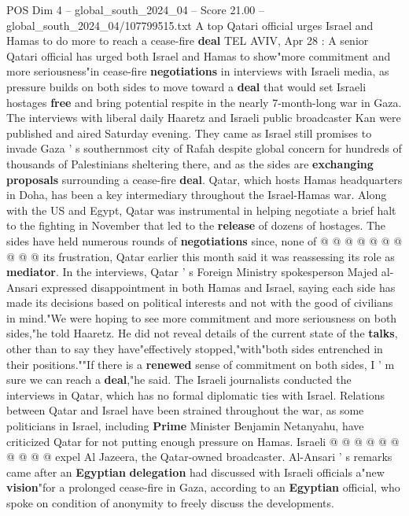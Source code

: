 \begin{textsample}{POS Dim 4 – global\_south\_2024\_04 – Score 21.00 – global\_south\_2024\_04/107799515.txt}  \label{ex:f4_pos_263}
A top Qatari official urges Israel and Hamas to do more to reach a cease-fire \textbf{deal} TEL AVIV, Apr 28 : A senior Qatari official has urged both Israel and Hamas to show"more commitment and more seriousness"in cease-fire \textbf{negotiations} in interviews with Israeli media, as pressure builds on both sides to move toward a \textbf{deal} that would set Israeli hostages \textbf{free} and bring potential respite in the nearly 7-month-long war in Gaza.
The interviews with liberal daily Haaretz and Israeli public broadcaster Kan were published and aired Saturday evening.
They came as Israel still promises to invade Gaza ' s southernmost city of Rafah despite global concern for hundreds of thousands of Palestinians sheltering there, and as the sides are \textbf{exchanging} \textbf{proposals} surrounding a cease-fire \textbf{deal}.
Qatar, which hosts Hamas headquarters in Doha, has been a key intermediary throughout the Israel-Hamas war.
Along with the US and Egypt, Qatar was instrumental in helping negotiate a brief halt to the fighting in November that led to the \textbf{release} of dozens of hostages.
The sides have held numerous rounds of \textbf{negotiations} since, none of @ @ @ @ @ @ @ @ @ @ its frustration, Qatar earlier this month said it was reassessing its role as \textbf{mediator}.
In the interviews, Qatar ' s Foreign Ministry spokesperson Majed al-Ansari expressed disappointment in both Hamas and Israel, saying each side has made its decisions based on political interests and not with the good of civilians in mind."We were hoping to see more commitment and more seriousness on both sides,"he told Haaretz.
He did not reveal details of the current state of the \textbf{talks}, other than to say they have"effectively stopped,"with"both sides entrenched in their positions.""If there is a \textbf{renewed} sense of commitment on both sides, I ' m sure we can reach a \textbf{deal},"he said.
The Israeli journalists conducted the interviews in Qatar, which has no formal diplomatic ties with Israel.
Relations between Qatar and Israel have been strained throughout the war, as some politicians in Israel, including \textbf{Prime} Minister Benjamin Netanyahu, have criticized Qatar for not putting enough pressure on Hamas.
Israeli @ @ @ @ @ @ @ @ @ @ expel Al Jazeera, the Qatar-owned broadcaster.
Al-Ansari ' s remarks came after an \textbf{Egyptian} \textbf{delegation} had discussed with Israeli officials a"new \textbf{vision}"for a prolonged cease-fire in Gaza, according to an \textbf{Egyptian} official, who spoke on condition of anonymity to freely discuss the developments.

\end{textsample}
